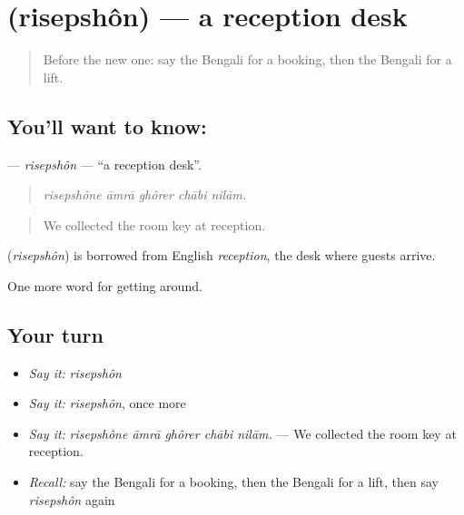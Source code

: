 \section[\texorpdfstring{\bn{রিসেপশন} (risepshôn)}{রিসেপশন (risepshôn)}]{ (risepshôn) — a reception desk}

\label{lesson:BN-C403-risepshon}



\begin{quote}
Before the new one: say the Bengali for a booking, then the Bengali for a lift.
\end{quote}

\subsection*{You'll want to know: }
\textbf{} — \emph{risepshôn} — \textquotedblleft{}a reception desk\textquotedblright{}.

\begin{quote}
    
\end{quote}

\begin{quote}
\emph{risepshône āmrā ghôrer chābi nilām.}
\end{quote}

\begin{quote}
We collected the room key at reception.
\end{quote}

\begin{cousinweb}
\textbf{} (\emph{risepshôn}) is borrowed from English \emph{reception}, the desk where guests arrive.
\end{cousinweb}

\begin{grammarlens}[title={What you've built}]
One more word for getting around.
\end{grammarlens}

\subsection*{Your turn}
\begin{itemize}
\raggedright
  \item \emph{Say it:} \emph{risepshôn}
  \item \emph{Say it:} \emph{risepshôn}, once more
  \item \emph{Say it:} \emph{risepshône āmrā ghôrer chābi nilām.} — We collected the room key at reception.
  \item \emph{Recall:} say the Bengali for a booking, then the Bengali for a lift, then say \emph{risepshôn} again
\end{itemize}

